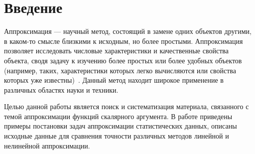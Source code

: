 \chapter*{Введение}

Аппроксимация --- научный метод, состоящий в замене одних объектов другими,
в каком-то смысле близкими к исходным, но более простыми.
Аппроксимация позволяет исследовать числовые характеристики и
качественные свойства объекта, сводя задачу к изучению более простых или
более удобных объектов (например, таких, характеристики которых легко
вычисляются или свойства которых уже известны)~\cite{wiki_approximation}.
Данный метод находит широкое применение в различных областях науки и техники.

Целью данной работы является поиск и систематизация материала,
связанного с темой аппроксимации функций скалярного аргумента.
В работе приведены примеры постановки задач аппроксимации статистических данных,
описаны исходные данные для сравнения точности различных методов
линейной и нелинейной аппроксимации.